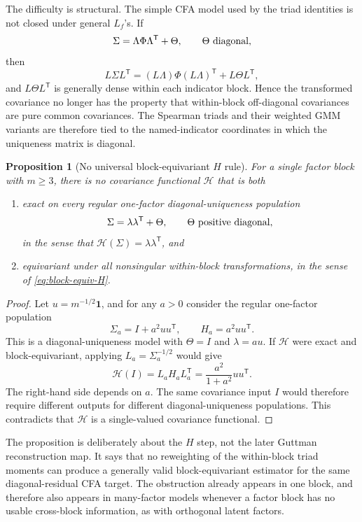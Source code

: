 \documentclass[11pt]{article}
\newcommand{\T}{^{\mathsf T}}
\theoremstyle{plain}
\newtheorem{proposition}{Proposition}
\theoremstyle{remark}
\begin{document}
The difficulty is structural. The simple CFA model used by the triad identities
is not closed under general \(L_f\)'s. If
\[
  \Sigma=\Lambda\Phi\Lambda\T+\Theta,
  \qquad \Theta \hbox{ diagonal},
\]
then
\[
  L\Sigma L\T
  =
  (L\Lambda)\Phi(L\Lambda)\T+L\Theta L\T,
\]
and \(L\Theta L\T\) is generally dense within each indicator block. Hence the
transformed covariance no longer has the property that within-block
off-diagonal covariances are pure common covariances. The Spearman triads and
their weighted GMM variants are therefore tied to the named-indicator
coordinates in which the uniqueness matrix is diagonal.

\begin{proposition}[No universal block-equivariant \(H\) rule]
\label{prop:no-block-equiv-H}
For a single factor block with \(m\ge3\), there is no covariance functional
\(\mathcal H\) that is both
\begin{enumerate}
\item exact on every regular one-factor diagonal-uniqueness population
  \[
    \Sigma=\lambda\lambda\T+\Theta,
    \qquad \Theta \hbox{ positive diagonal},
  \]
  in the sense that \(\mathcal H(\Sigma)=\lambda\lambda\T\), and
\item equivariant under all nonsingular within-block transformations, in the
  sense of \eqref{eq:block-equiv-H}.
\end{enumerate}
\end{proposition}

\begin{proof}
Let \(u=m^{-1/2}\mathbf 1\), and for any \(a>0\) consider the regular
one-factor population
\[
  \Sigma_a=I+a^2uu\T,
  \qquad
  H_a=a^2uu\T .
\]
This is a diagonal-uniqueness model with \(\Theta=I\) and \(\lambda=au\).
If \(\mathcal H\) were exact and block-equivariant, applying
\(L_a=\Sigma_a^{-1/2}\) would give
\[
  \mathcal H(I)
  =
  L_aH_aL_a\T
  =
  \frac{a^2}{1+a^2}uu\T .
\]
The right-hand side depends on \(a\). The same covariance input \(I\) would
therefore require different outputs for different diagonal-uniqueness
populations. This contradicts that \(\mathcal H\) is a single-valued
covariance functional.
\end{proof}

The proposition is deliberately about the \(H\) step, not the later Guttman
reconstruction map. It says that no reweighting of the within-block triad
moments can produce a generally valid block-equivariant estimator for the same
diagonal-residual CFA target. The obstruction already appears in one block, and
therefore also appears in many-factor models whenever a factor block has no
usable cross-block information, as with orthogonal latent factors.
\end{document}
